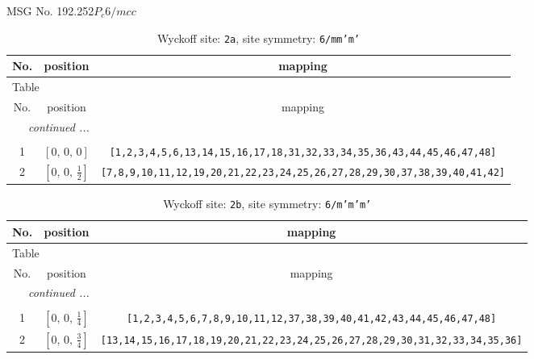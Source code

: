 \documentclass[fleqn,8pt]{jsarticle}
\begin{document}
\setcounter{MaxMatrixCols}{32}

\renewcommand{\tablename}{Table~}
\renewcommand{\figurename}{Figure~}
\begin{center}
\LARGE
MSG No. 192.252\quad$P_{c}6/mcc$
\end{center}
\renewcommand{\arraystretch}{1.2}
\begin{longtable}{ccc}
\caption{Wyckoff site: {\tt 2a}, site symmetry: {\tt 6/mm'm'}}
 \\
 \hline \hline
No. & position & mapping \\ \hline \endfirsthead

\multicolumn{2}{l}{\tablename\ \thetable{}} \\
 \hline \hline
No. & position & mapping \\ \hline \endhead

 \hline \hline
\multicolumn{2}{r}{\footnotesize\it continued ...} \\ \endfoot

 \hline \hline
\multicolumn{2}{r}{} \\ \endlastfoot

1 & $\left[ 0,\, 0,\, 0 \right]$ & {\tt [1,2,3,4,5,6,13,14,15,16,17,18,31,32,33,34,35,36,43,44,45,46,47,48]} \\ \hline
2 & $\left[ 0,\, 0,\, \frac{1}{2} \right]$ & {\tt [7,8,9,10,11,12,19,20,21,22,23,24,25,26,27,28,29,30,37,38,39,40,41,42]} \\
\end{longtable}
\renewcommand{\arraystretch}{1.2}
\begin{longtable}{ccc}
\caption{Wyckoff site: {\tt 2b}, site symmetry: {\tt 6/m'm'm'}}
 \\
 \hline \hline
No. & position & mapping \\ \hline \endfirsthead

\multicolumn{2}{l}{\tablename\ \thetable{}} \\
 \hline \hline
No. & position & mapping \\ \hline \endhead

 \hline \hline
\multicolumn{2}{r}{\footnotesize\it continued ...} \\ \endfoot

 \hline \hline
\multicolumn{2}{r}{} \\ \endlastfoot

1 & $\left[ 0,\, 0,\, \frac{1}{4} \right]$ & {\tt [1,2,3,4,5,6,7,8,9,10,11,12,37,38,39,40,41,42,43,44,45,46,47,48]} \\ \hline
2 & $\left[ 0,\, 0,\, \frac{3}{4} \right]$ & {\tt [13,14,15,16,17,18,19,20,21,22,23,24,25,26,27,28,29,30,31,32,33,34,35,36]} \\
\end{longtable}
\end{document}

